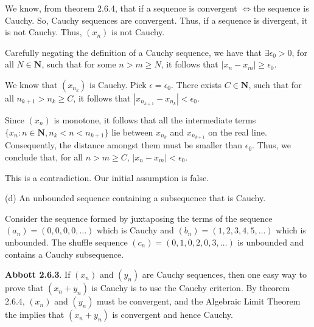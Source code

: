 \documentclass[10pt]{article}
\begin{document}
We know, from theorem 2.6.4, that if a sequence is convergent $\displaystyle \Longleftrightarrow $the sequence is Cauchy. So, Cauchy sequences are convergent. Thus, if a sequence is divergent, it is not Cauchy. Thus, $\displaystyle ( x_{n})$ is not Cauchy.



Carefully negating the definition of a Cauchy sequence, we have that $\displaystyle \exists \epsilon _{0}  >0$, for all $\displaystyle N\in \mathbf{N}$, such that for some $\displaystyle n >m\geq N$, it follows that $\displaystyle |x_{n} -x_{m} |\geq \epsilon _{0}$. 



We know that $\displaystyle ( x_{n_{k}})$ is Cauchy. Pick $\displaystyle \epsilon =\epsilon _{0}$. There exists $\displaystyle C\in \mathbf{N}$, such that for all $\displaystyle n_{k+1}  >n_{k} \geq C$, it follows that $\displaystyle |x_{n_{k+1}} -x_{n_{k}} |< \epsilon _{0}$. 



Since $\displaystyle ( x_{n})$ is monotone, it follows that all the intermediate terms $\displaystyle \{x_{n} :n\in \mathbf{N} ,n_{k} < n< n_{k+1}\}$ lie between $\displaystyle x_{n_{k}}$ and $\displaystyle x_{n_{k+1}}$ on the real line. Consequently, the distance amongst them must be smaller than $\displaystyle \epsilon _{0}$. Thus, we conclude that, for all $\displaystyle n >m\geq C$, $\displaystyle |x_{n} -x_{m} |< \epsilon _{0}$. 



This is a contradiction. Our initial assumption is false.



(d) An unbounded sequence containing a subsequence that is Cauchy.



Consider the sequence formed by juxtaposing the terms of the sequence $\displaystyle ( a_{n}) =( 0,0,0,0,\dotsc )$ which is Cauchy and $\displaystyle ( b_{n}) =( 1,2,3,4,5,\dotsc )$ which is unbounded. The shuffle sequence $\displaystyle ( c_{n}) =( 0,1,0,2,0,3,\dotsc )$ is unbounded and contains a Cauchy subsequence.



\textbf{Abbott 2.6.3}. If $\displaystyle ( x_{n})$ and $\displaystyle ( y_{n})$ are Cauchy sequences, then one easy way to prove that $\displaystyle ( x_{n} +y_{n})$ is Cauchy is to use the Cauchy criterion. By theorem 2.6.4, $\displaystyle ( x_{n})$ and $\displaystyle ( y_{n})$ must be convergent, and the Algebraic Limit Theorem the implies that $\displaystyle ( x_{n} +y_{n})$ is convergent and hence Cauchy.
\end{document}
